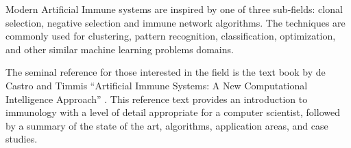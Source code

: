 \begin{bibunit}
Modern Artificial Immune systems are inspired by one of three sub-fields: clonal selection, negative selection and immune network algorithms. The techniques are commonly used for clustering, pattern recognition, classification, optimization, and other similar machine learning problems domains.

The seminal reference for those interested in the field is the text book by de Castro and Timmis ``Artificial Immune Systems: A New Computational Intelligence Approach'' \cite{Castro2002}. This reference text provides an introduction to immunology with a level of detail appropriate for a computer scientist, followed by a summary of the state of the art, algorithms, application areas, and case studies.

\putbib
\end{bibunit}

\newpage\begin{bibunit}\putbib\end{bibunit}
\newpage\begin{bibunit}\putbib\end{bibunit}
\newpage\begin{bibunit}\putbib\end{bibunit}
\newpage\begin{bibunit}\putbib\end{bibunit}
\newpage\begin{bibunit}\putbib\end{bibunit}
